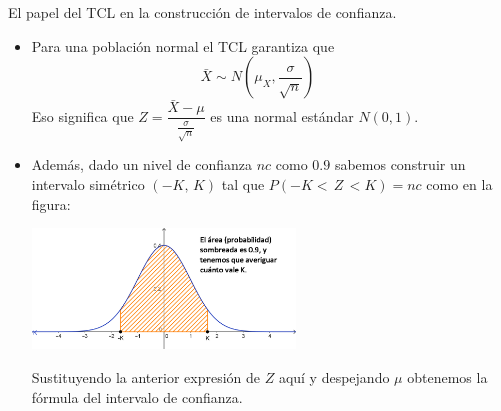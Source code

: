 \documentclass[
  9pt,
  ignorenonframetext,
]{beamer}
\begin{document}
\begin{frame}{El papel del TCL en la construcción de intervalos de
confianza.}
\protect\hypertarget{el-papel-del-tcl-en-la-construccion-de-intervalos-de-confianza.}{}

\begin{itemize}
\item
  Para una población normal el TCL garantiza que \[
  \bar X \sim N\left(\mu_X,\frac{\sigma}{\sqrt{n}}\right) \qquad
  \] Eso significa que
  \(Z = \dfrac{\bar X - \mu}{\frac{\sigma}{\sqrt{n}}}\) es una normal
  estándar \(N(0, 1)\).
\item
  Además, dado un nivel de confianza \(nc\) como \(0.9\) sabemos
  construir un intervalo simétrico \((-K,\, K)\) tal que
  \(P(-K < \, Z \,< K) = nc\) como en la figura:

  \begin{center}\includegraphics[width=7cm]{../fig/06-02-ProblemaInversoZ-02} \end{center}

  Sustituyendo la anterior expresión de \(Z\) aquí y despejando \(\mu\)
  obtenemos la fórmula del intervalo de confianza.
\end{itemize}

\end{frame}
\end{document}
